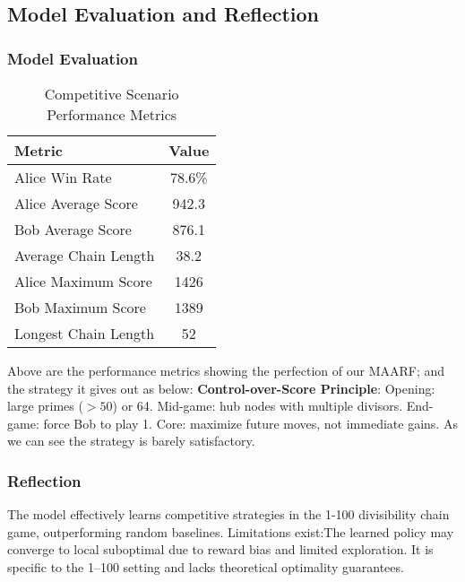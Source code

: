 \documentclass[twocolumn, a4paper]{article}
\begin{document}
\subsection{Model Evaluation and Reflection}
\subsubsection{Model Evaluation}
\begin{table}[h]
\centering
\caption{Competitive Scenario Performance Metrics}
\label{tab:competitive_results}
\begin{tabular}{lc}
\hline
\textbf{Metric} & \textbf{Value} \\
\hline
Alice Win Rate & 78.6\% \\
Alice Average Score & 942.3 \\
Bob Average Score & 876.1 \\
Average Chain Length & 38.2 \\
Alice Maximum Score & 1426 \\
Bob Maximum Score & 1389 \\
Longest Chain Length & 52 \\
\hline
\end{tabular}
\end{table}
Above are the performance metrics showing the perfection of our MAARF; and the strategy it gives out as below:
\textbf{Control-over-Score Principle}: 
Opening: large primes ($>50$) or 64. 
Mid-game: hub nodes with multiple divisors. 
End-game: force Bob to play 1. 
Core: maximize future moves, not immediate gains.
As we can see the strategy is barely satisfactory. 

\subsubsection{Reflection}
The model effectively learns competitive strategies in the 1-100 divisibility chain game, outperforming random baselines. Limitations exist:The learned policy may converge to local suboptimal due to reward bias and limited exploration. It is specific to the 1--100 setting and lacks theoretical optimality guarantees.
\end{document}
